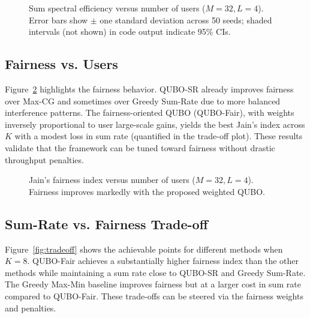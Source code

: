 {\begin{figure}[htbp]
\centering
{}
\caption{Sum spectral efficiency versus number of users ($M=32, L=4$). Error bars show $\pm$ one standard deviation across 50 seeds; shaded intervals (not shown) in code output indicate 95\% CIs.}
\label{fig:sum_rate}
\end{figure}

\subsection{Fairness vs. Users}
Figure~\ref{fig:fairness} highlights the fairness behavior. QUBO-SR already improves fairness over Max-CG and sometimes over Greedy Sum-Rate due to more balanced interference patterns. The fairness-oriented QUBO (QUBO-Fair), with weights inversely proportional to user large-scale gains, yields the best Jain’s index across $K$ with a modest loss in sum rate (quantified in the trade-off plot). These results validate that the framework can be tuned toward fairness without drastic throughput penalties.

\begin{figure}[htbp]
\centering
{}
\caption{Jain’s fairness index versus number of users ($M=32, L=4$). Fairness improves markedly with the proposed weighted QUBO.}
\label{fig:fairness}
\end{figure}

\subsection{Sum-Rate vs. Fairness Trade-off}
Figure~\ref{fig:tradeoff} shows the achievable points for different methods when $K=8$. QUBO-Fair achieves a substantially higher fairness index than the other methods while maintaining a sum rate close to QUBO-SR and Greedy Sum-Rate. The Greedy Max-Min baseline improves fairness but at a larger cost in sum rate compared to QUBO-Fair. These trade-offs can be steered via the fairness weights and penalties.

}
